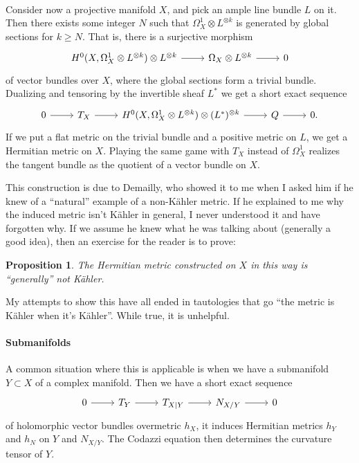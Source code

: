 \documentclass[11pt]{article}
\newtheorem{prop}[theo]{Proposition}
\begin{document}
\paragraph{}

Consider now a projective manifold $X$, and pick an ample line bundle $L$ on it. Then there exists some integer $N$ such that $\Omega_X^1 \otimes L^{\otimes k}$ is generated by global sections for $k \geq N$. That is, there is a surjective morphism
\[
\begin{tikzcd}
H^0(X, \Omega_X^1 \otimes L^{\otimes k}) \otimes L^{\otimes k} \arrow[r] & \Omega_X \otimes L^{\otimes k} \arrow[r] & 0
\end{tikzcd}
\]
of vector bundles over $X$, where the global sections form a trivial bundle. Dualizing and tensoring by the invertible sheaf $L^*$ we get a short exact sequence
\[
\begin{tikzcd}
0 \arrow[r] & T_X \arrow[r] & H^0(X, \Omega_X^1 \otimes L^{\otimes k}) \otimes (L^*)^{\otimes k} \arrow[r] & Q \arrow[r] & 0.
\end{tikzcd}
\]
If we put a flat metric on the trivial bundle and a positive metric on $L$, we get a Hermitian metric on $X$. Playing the same game with $T_X$ instead of $\Omega_X^1$ realizes the tangent bundle as the quotient of a vector bundle on $X$.

This construction is due to Demailly, who showed it to me when I asked him if he knew of a ``natural'' example of a non-K\"ahler metric. If he explained to me why the induced metric isn't K\"ahler in general, I never understood it and have forgotten why. If we assume he knew what he was talking about (generally a good idea), then an exercise for the reader is to prove:

\begin{prop}
The Hermitian metric constructed on $X$ in this way is ``generally'' not K\"ahler.
\end{prop}

My attempts to show this have all ended in tautologies that go ``the metric is K\"ahler when it's K\"ahler''. While true, it is unhelpful.




\paragraph{Submanifolds}

A common situation where this is applicable is when we have a submanifold $Y \subset X$ of a complex manifold. Then we have a short exact sequence
\[
\begin{tikzcd}
0 \arrow[r] & T_Y \arrow[r] & T_{X|Y} \arrow[r] & N_{X/Y} \arrow[r] & 0
\end{tikzcd}
\]
of holomorphic vector bundles overmetric $h_X$, it induces Hermitian metrics $h_Y$ and $h_{N}$ on $Y$ and $N_{X/Y}$. The Codazzi equation then determines the curvature tensor of $Y$.
\end{document}
